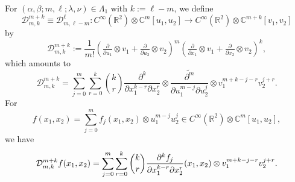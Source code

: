 \documentclass[reqno,11pt]{amsart}
\theoremstyle{remark}
\numberwithin{equation}{section}
\newcommand{\gb}{\beta}
\newcommand{\ga}{\alpha}
\newcommand{\gL}{\Lambda}
\newcommand{\R}{\mathbb{R}}
\newcommand{\C}{\mathbb{C}}
\newcommand{\Cal}{\mathcal}
\newcommand{\To}{\longrightarrow}
\begin{document}
For $(\ga, \gb; m,\ell; \lambda,\nu) \in \gL_1$ with $k:=\ell-m$, 
we define 
\begin{equation*}
\Cal{D}^{m+k}_{m,k} \equiv \Cal{D}_{m,\ell-m}^{\ell}  \colon C^\infty(\R^2)\otimes \C^m[u_1, u_2]
\To
C^\infty(\R^2)\otimes \C^{m+k}[v_1, v_2]
\end{equation*}
by
\begin{equation}\label{eqn:IDO1}
\Cal{D}^{m+k}_{m,k} :=
\frac{1}{m!}
\left(\tfrac{\partial}{\partial u_1}\otimes v_1 + \tfrac{\partial}{\partial u_2}\otimes v_2\right)^m
\left(\tfrac{\partial}{\partial x_1}\otimes v_1 + \tfrac{\partial}{\partial x_2}\otimes v_2\right)^k,
\end{equation}
which amounts to
\begin{equation*}
\Cal{D}^{m+k}_{m,k}
=
\sum_{j=0}^m\sum_{r=0}^k
\binom{k}{r}\frac{\partial^k}{\partial x_1^{k-r} \partial x_2^r}
\otimes \widetilde{\frac{\partial^m}{\partial u_1^{m-j}\partial u_2^j} }
\otimes v_1^{m+k-j-r}v_2^{j+r}.
\end{equation*}
For 
\begin{equation*}
f(x_1, x_2) 
= \sum_{j=0}^m f_j(x_1,x_2) 
\otimes u_1^{m-j}u_2^j \in C^\infty(\R^2)\otimes \C^m[u_1, u_2], 
\end{equation*}
we have 
\begin{equation}\label{eqn:20250811}
\Cal{D}^{m+k}_{m,k}f(x_1, x_2) = 
\sum_{j=0}^m\sum_{r=0}^k
\binom{k}{r}\frac{\partial^kf_j}{\partial x_1^{k-r} \partial x_2^r}(x_1, x_2)
\otimes v_1^{m+k-j-r}v_2^{j+r}.\\[3pt]
\end{equation}
\end{document}
